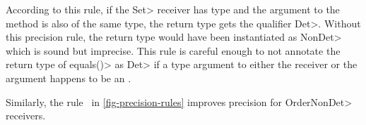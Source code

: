 According to this rule, if the \<Set> receiver has type  and the argument to the  method is
also of the same type, the return type gets the qualifier \<Det>. Without this precision rule, the return type would have been instantiated as \<NonDet> which
is sound but imprecise. This rule is careful enough to not annotate the return type of \<equals()> as \<Det> if a type argument to either the
receiver or the argument happens to be an .

Similarly, the rule \ in \cref{fig-precision-rules}
improves precision for \<OrderNonDet> receivers.


